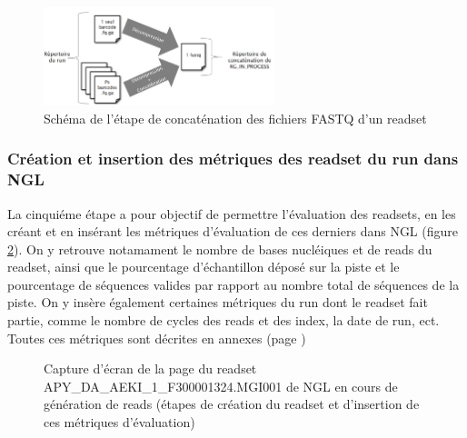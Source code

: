 \begin{figure}[H]
    \centering
    \includegraphics[width=0.6\textwidth]{img/Schéma_concaténation.png}
    \caption{\footnotesize{Schéma de l'étape de \og concaténation\fg{} des fichiers FASTQ d'un readset}}
    \label{schema-concat-fastq}
\end{figure}

\subsubsection{Création et insertion des métriques des readset du run dans NGL}
La cinquiéme étape a pour objectif de permettre l'évaluation des readsets, en les créant et en insérant les métriques d'évaluation de ces derniers dans NGL (figure \ref{NGL-screenshot_readset}).
On y retrouve notamament le nombre de bases nucléiques et de reads du readset, ainsi que le pourcentage d'échantillon déposé sur la piste et le pourcentage de séquences valides par rapport au nombre total de séquences de la piste.
On y insère également certaines métriques du run dont le readset fait partie, comme le nombre de cycles des reads et des index, la date de run, ect. Toutes ces métriques sont décrites en annexes (page \pageref{anexes3})

\begin{figure}[H]
    \centering
    \caption{\footnotesize{Capture d'écran de la page du readset APY\_DA\_AEKI\_1\_F300001324.MGI001 de NGL en cours de génération de reads (étapes de création du readset et d'insertion de ces métriques d'évaluation)}}
    \label{NGL-screenshot_readset}
\end{figure}

